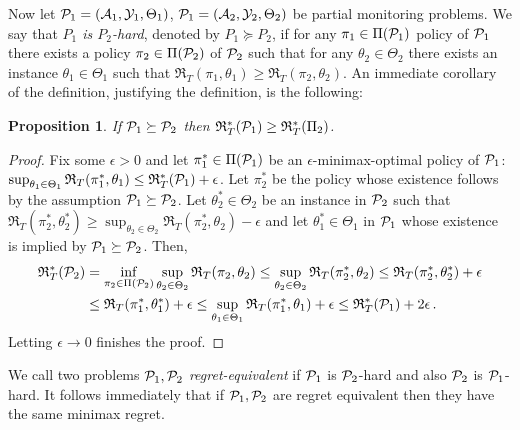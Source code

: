 \documentclass[11pt]{article} %
\newcommand{\Y}{\mathcal{Y}}
\newcommand{\A}{\mathcal{A}}
\newcommand{\Regret}{\mathfrak{R}}
\newtheorem{prop}{Proposition}
\begin{document}
Now let $\P_1 = (\A_1,\Y_1,\Theta_1)$, $\P_1 = (\A_2,\Y_2,\Theta_2)$ be partial monitoring problems.
We say that \emph{$P_1$ is $P_2$-hard}, 
denoted by $P_1 \succeq P_2$, if for any $\pi_1\in \Pi(\P_1)$ policy of $\P_1$ there exists a policy $\pi_2\in \Pi(\P_2)$ of $\P_2$
such that for any $\theta_2\in \Theta_2$ there exists an instance $\theta_1\in \Theta_1$ such that $\Regret_T(\pi_1,\theta_1)\ge \Regret_T(\pi_2,\theta_2)$. An immediate corollary of the definition, justifying the definition, is the following:
\begin{prop}
If $\P_1\succeq \P_2$ then $\Regret_T^*(\P_1)\ge \Regret_T^*(\Pi_2)$.
\end{prop}
\begin{proof}
Fix some $\epsilon>0$ and 
let $\pi_1^*\in \Pi(\P_1)$ be an $\epsilon$-minimax-optimal policy of $\P_1$: 
$\sup_{\theta_1\in\Theta_1} \Regret_T(\pi_1^*,\theta_1) \le \Regret_T^*(\P_1)+\epsilon$.
Let $\pi_2^*$ be the policy whose existence follows by the assumption $\P_1\succeq \P_2$.
Let $\theta_2^*\in \Theta_2$ be an instance in $\P_2$ such that 
$\Regret_T(\pi_2^*,\theta_2^*)\ge \sup_{\theta_2\in \Theta_2} \Regret_T(\pi_2^*,\theta_2)-\epsilon$
and let $\theta_1^*\in \Theta_1$ in $\P_1$ whose existence is implied by $\P_1\succeq \P_2$.
Then,
\begin{align*}
 \Regret_T^*(\P_2) &= 
\inf_{\pi_2\in \Pi(\P_2)} \sup_{\theta_2\in \Theta_2} \Regret_T(\pi_2,\theta_2)
\le \sup_{\theta_2\in \Theta_2} \Regret_T(\pi_2^*,\theta_2) 
\le  \Regret_T(\pi_2^*,\theta_2^*)+\epsilon \\
& \le  \Regret_T(\pi_1^*,\theta_1^*)+\epsilon
\le \sup_{\theta_1\in \Theta_1} \Regret_T(\pi_1^*,\theta_1)+\epsilon
\le \Regret_T^*(\P_1) +2\epsilon\,.
\end{align*}
Letting $\epsilon\to 0$ finishes the proof.
\end{proof}
We call two problems \emph{$\P_1,\P_2$ regret-equivalent} if $\P_1$ is $\P_2$-hard and also $\P_2$ is $\P_1$-hard.
It follows immediately that if $\P_1,\P_2$ are regret equivalent then they have the same minimax regret.
\end{document}
